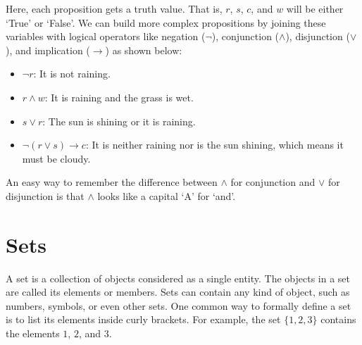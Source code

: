 \documentclass[a4paper, twoside]{article}
\newcommand{\rarrow}{\rightarrow}
\begin{document}
Here, each proposition gets a truth value. That is, \(r\), \(s\), \(c\), and \(w\) will be either `True' or `False'. We can build more complex propositions by joining these variables with logical operators like negation (\( \neg \)), conjunction (\(\land\)), disjunction (\(\lor\)), and implication (\(\rarrow\)) as shown below:

\begin{itemize}
    \item \(\neg r\): It is not raining.
    \item \(r \land w\): It is raining and the grass is wet.
    \item \(s \lor r\): The sun is shining or it is raining.
    \item \(\neg (r \lor s) \rarrow c\): It is neither raining nor is the sun shining, which means it must be cloudy.
\end{itemize}

An easy way to remember the difference between \(\land\) for conjunction and \(\lor\) for disjunction is that \(\land\) looks like a capital `A' for `and'. 


\newpage

\section{Sets}
A set is a collection of objects considered as a single entity. The objects in a set are called its elements or members. Sets can contain any kind of object, such as numbers, symbols, or even other sets. One common way to formally define a set is to list its elements inside curly brackets. For example, the set \(\{1, 2, 3\}\) contains the elements \(1\), \(2\), and \(3\).
\end{document}

